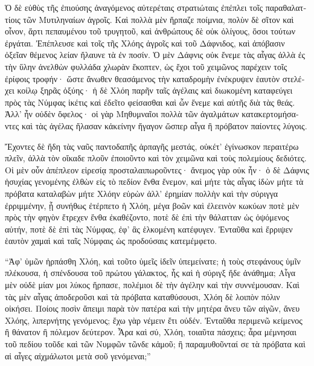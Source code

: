 \documentclass{book}
\begin{document}
\begin{pairs}
\begin{Leftside}
\begin{greek}
  Ὁ δὲ εὐθὺς τῆς ἐπιούσης ἀναγόμενος αὐτερέταις στρατιώταις ἐπέπλει τοῖς παραθαλαττίοις τῶν Μυτιληναίων ἀγροῖς. Καὶ πολλὰ μὲν ἥρπαζε ποίμνια, πολὺν δὲ σῖτον καὶ οἶνον, ἄρτι πεπαυμένου τοῦ τρυγητοῦ, καὶ ἀνθρώπους δὲ οὐκ ὀλίγους, ὅσοι τούτων ἐργάται.  Ἐπέπλευσε καὶ τοῖς τῆς Χλόης ἀγροῖς καὶ τοῦ Δάφνιδος, καὶ ἀπόβασιν ὀξεῖαν θέμενος λείαν ἤλαυνε τὰ ἐν ποσίν. Ὁ μὲν Δάφνις οὐκ ἔνεμε τὰς αἶγας ἀλλὰ ἐς τὴν ὕλην ἀνελθὼν φυλλάδα χλωρὰν ἔκοπτεν, ὡς ἔχοι τοῦ χειμῶνος παρέχειν τοῖς ἐρίφοις τροφήν· ὥστε ἄνωθεν θεασάμενος τὴν καταδρομὴν ἐνέκρυψεν ἑαυτὸν στελέχει κοίλῳ ξηρᾶς ὀξύης·  ἡ δὲ Χλόη παρῆν ταῖς ἀγέλαις καὶ διωκομένη καταφεύγει πρὸς τὰς Νύμφας ἱκέτις καὶ ἐδεῖτο φείσασθαι καὶ ὧν ἔνεμε καὶ αὐτῆς διὰ τὰς θεάς. Ἀλλ’ ἦν οὐδὲν ὄφελος· οἱ γὰρ Μηθυμναῖοι πολλὰ τῶν ἀγαλμάτων κατακερτομήσαντες καὶ τὰς ἀγέλας ἤλασαν κἀκείνην ἤγαγον ὥσπερ αἶγα ἢ πρόβατον παίοντες λύγοις.
\pend


  Ἔχοντες δὲ ἤδη τὰς ναῦς παντοδαπῆς ἁρπαγῆς μεστάς, οὐκέτ’ ἐγίνωσκον περαιτέρω πλεῖν, ἀλλὰ τὸν οἴκαδε πλοῦν ἐποιοῦντο καὶ τὸν χειμῶνα καὶ τοὺς πολεμίους δεδιότες. Οἱ μὲν οὖν ἀπέπλεον εἰρεσίᾳ προσταλαιπωροῦντες·  ἄνεμος γὰρ οὐκ ἦν· ὁ δὲ Δάφνις ἡσυχίας γενομένης ἐλθὼν εἰς τὸ πεδίον ἔνθα ἔνεμον, καὶ μήτε τὰς αἶγας ἰδὼν μήτε τὰ πρόβατα καταλαβὼν μήτε Χλόην εὑρὼν ἀλλ’ ἐρημίαν πολλὴν καὶ τὴν σύριγγα ἐρριμμένην,  ᾗ συνήθως ἐτέρπετο ἡ Χλόη, μέγα βοῶν καὶ ἐλεεινὸν κωκύων ποτὲ μὲν πρὸς τὴν φηγὸν ἔτρεχεν ἔνθα ἐκαθέζοντο, ποτὲ δὲ ἐπὶ τὴν θάλατταν ὡς ὀψόμενος αὐτήν, ποτὲ δὲ ἐπὶ τὰς Νύμφας, ἐφ’ ἃς ἑλκομένη κατέφυγεν. Ἐνταῦθα καὶ ἔρριψεν ἑαυτὸν χαμαὶ καὶ ταῖς Νύμφαις ὡς προδούσαις κατεμέμφετο.
\pend


  “Ἀφ’ ὑμῶν ἡρπάσθη Χλόη, καὶ τοῦτο ὑμεῖς ἰδεῖν ὑπεμείνατε; ἡ τοὺς στεφάνους ὑμῖν πλέκουσα, ἡ σπένδουσα τοῦ πρώτου γάλακτος, ἧς καὶ ἡ σύριγξ ἥδε ἀνάθημα;  Αἶγα μὲν οὐδὲ μίαν μοι λύκος ἥρπασε, πολέμιοι δὲ τὴν ἀγέλην καὶ τὴν συννέμουσαν. Καὶ τὰς μὲν αἶγας ἀποδεροῦσι καὶ τὰ πρόβατα καταθύσουσι,  Χλόη δὲ λοιπὸν πόλιν οἰκήσει. Ποίοις ποσὶν ἄπειμι παρὰ τὸν πατέρα καὶ τὴν μητέρα ἄνευ τῶν αἰγῶν, ἄνευ Χλόης, λιπερνήτης γενόμενος; ἔχω γὰρ νέμειν ἔτι οὐδέν.  Ἐνταῦθα περιμενῶ κείμενος ἢ θάνατον ἢ πόλεμον δεύτερον. Ἆρα καὶ σύ, Χλόη, τοιαῦτα πάσχεις; ἆρα μέμνησαι τοῦ πεδίου τοῦδε καὶ τῶν Νυμφῶν τῶνδε κἀμοῦ; ἢ παραμυθοῦνταί σε τὰ πρόβατα καὶ αἱ αἶγες αἰχμάλωτοι μετὰ σοῦ γενόμεναι;”
\pend



\end{greek}
\end{Leftside}
\end{pairs}
\end{document}
